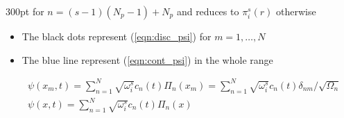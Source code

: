 \begin{frame}
\begin{textblock*}{300pt}
\noindent for $n = (s-1)(N_p-1) + N_p$ and reduces to $\pi^s_i(r)$ otherwise
\begin{itemize}
\item The black dots represent (\ref{eqn:disc_psi}) for $m=1,\ldots,N$
\item The blue line represent (\ref{eqn:cont_psi}) in the whole range
\end{itemize}
 \begin{align}
 & \psi(x_m,t) = \sum_{n=1}^{N} \sqrt{\omega^s_i}
           c_n(t)\Pi_n(x_{m}) 
                        = \sum_{n=1}^{N} \sqrt{\omega^s_i}
           c_n(t)\delta_{nm} / \sqrt{\Omega_n}  \label{eqn:disc_psi}\\
 & \psi(x,t) = \sum_{n=1}^{N} \sqrt{\omega^s_i}
           c_n(t)\Pi_n(x)  \label{eqn:cont_psi}
 \end{align}


\end{textblock*}

\end{frame}




